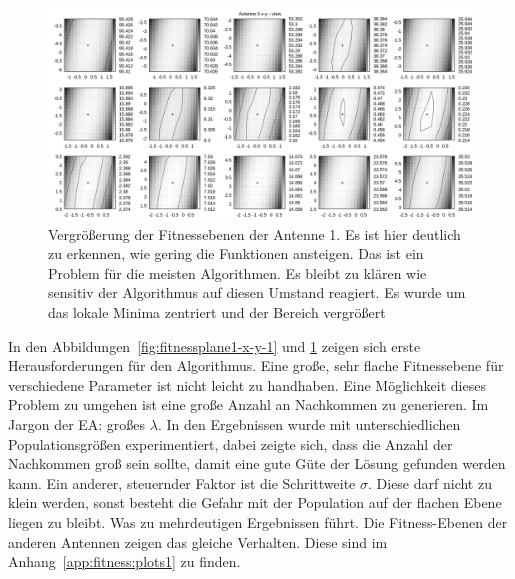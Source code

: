 \begin{figure}[ht!]
  \caption[Fitness Ebenen Heatmap, vergrößert]{Vergrößerung der Fitnessebenen der Antenne 1. Es ist hier deutlich zu erkennen, wie gering die Funktionen ansteigen. Das ist ein Problem für die meisten Algorithmen. Es bleibt zu klären wie sensitiv der Algorithmus auf diesen Umstand reagiert. Es wurde um das lokale Minima zentriert und der Bereich vergrößert} 
  \begin{center}
   \includegraphics[width=\textwidth]{img/fitness/xy_a0zoomed.png}
  \end{center}
  \label{fig:fitnessplane1-x-y-zoom-1}
%
\end{figure}
%
In den Abbildungen~\ref{fig:fitnessplane1-x-y-1} und \ref{fig:fitnessplane1-x-y-zoom-1} zeigen sich erste Herausforderungen für den Algorithmus. Eine große, sehr flache Fitnessebene für verschiedene Parameter ist nicht leicht zu handhaben. Eine Möglichkeit dieses Problem zu umgehen ist eine große Anzahl an Nachkommen zu generieren. Im Jargon der EA: großes $\lambda$. In den Ergebnissen wurde mit unterschiedlichen Populationsgrößen experimentiert, dabei zeigte sich, dass die Anzahl der Nachkommen groß sein sollte, damit eine gute Güte der Lösung gefunden werden kann. Ein anderer, steuernder Faktor ist die Schrittweite $\sigma$. Diese darf nicht zu klein werden, sonst besteht die Gefahr mit der Population auf der flachen Ebene liegen zu bleibt. Was zu mehrdeutigen Ergebnissen führt. Die Fitness-Ebenen der anderen Antennen zeigen das gleiche Verhalten. Diese sind im Anhang~\ref{app:fitness:plots1} zu finden. \\

